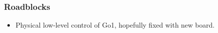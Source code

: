 \documentclass{beamer}
\begin{document}
\begin{frame}
    \frametitle{Roadblocks}
    \begin{itemize}
      \item Physical low-level control of Go1, hopefully fixed with new board.
    \end{itemize}
  \end{frame}
\end{document}
